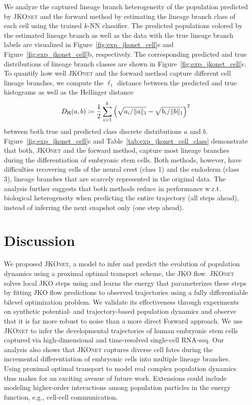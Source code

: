 We analyze the captured lineage branch heterogeneity of the population predicted by \textsc{JKOnet} and the forward method by estimating the lineage branch class of each cell using the trained $k$-NN classifier. The predicted populations colored by the estimated lineage branch as well as the data with the true lineage branch labels are visualized in Figure~\ref{fig:exp_jkonet_cell}e and Figure~\ref{fig:exp_jkonet_cell}b, respectively.
The corresponding predicted and true distributions of lineage branch classes are shown in Figure~\ref{fig:exp_jkonet_cell}c.
To quantify how well \textsc{JKOnet} and the forward method capture  different cell lineage branches, we compute the $\ell_1$ distance between the  predicted and true histograms as well as the Hellinger distance 
\begin{equation} \label{eq:hellinger}
    D_{\mathrm{H}}(a, b) \coloneqq \frac{1}{2} \sum_{i=1}^{k}\left(\sqrt{a_{i}/\|a\|_1}-\sqrt{b_{i}/\|b\|_1}\right)^{2}
\end{equation}
between both true and predicted class discrete distributions $a$ and $b$.
Figure~\ref{fig:exp_jkonet_cell}c and Table~\ref{tab:exp_jkonet_cell_class} demonstrate that both, \textsc{JKOnet} and the forward method, capture most lineage branches during the differentiation of embryonic stem cells. Both methods, however, have difficulties recovering cells of the neural crest (class 1) and the endoderm (class 3), lineage branches that are scarcely represented in the original data. 
The analysis further suggests that both methods reduce in performance w.r.t. biological heterogeneity when predicting the entire trajectory (all steps ahead), instead of inferring the next snapshot only (one step ahead).


\section{Discussion}
We proposed \textsc{JKOnet}, a model to infer and predict the evolution of population dynamics using a proximal optimal transport scheme, the \acrshort{JKO} flow.
\textsc{JKOnet} solves local \acrshort{JKO} steps using  and learns the energy that parameterizes these steps by fitting \acrshort{JKO} flow predictions to observed trajectories using a fully differentiable bilevel optimization problem.
We validate its effectiveness through experiments on synthetic potential- and trajectory-based population dynamics and observe that it is far more robust to noise than a more direct Forward approach. We use \textsc{JKOnet} to infer the developmental trajectories of human embryonic stem cells captured via high-dimensional and time-resolved single-cell RNA-seq. 
Our analysis also shows that \textsc{JKOnet} captures diverse cell fates during the incremental differentiation of embryonic cells into multiple lineage branches.
Using proximal optimal transport to model real complex population dynamics thus makes for an exciting avenue of future work. Extensions could include modeling higher-order interactions among population particles in the energy function, e.g., cell-cell communication.
